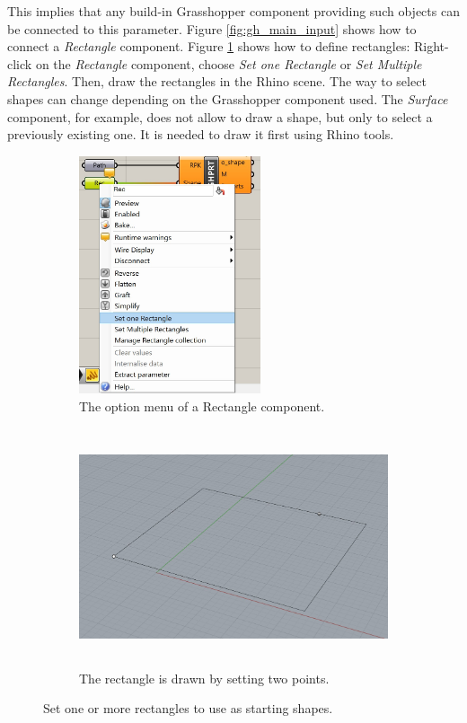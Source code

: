 This implies that any build-in Grasshopper component providing such objects can be connected to this parameter. Figure \ref{fig:gh_main_input} shows how to connect a \textit{Rectangle} component. Figure \ref{fig:gh_set_initial_shapes} shows how to define rectangles: Right-click on the \textit{Rectangle} component, choose \textit{Set one Rectangle} or \textit{Set Multiple Rectangles}. Then, draw the rectangles in the Rhino scene. The way to select shapes can change depending on the Grasshopper component used. The \textit{Surface} component, for example, does not allow to draw a shape, but only to select a previously existing one. It is needed to draw it first using Rhino tools.
\clearpage

\begin{figure}[h]
    
    \begin{subfigure}{0.5\textwidth}
        \includegraphics[width=0.9\linewidth, height=7cm]{res/man_gh_select_rectangle.jpg}
        \caption{The option menu of a Rectangle component.}
    \end{subfigure}
    \begin{subfigure}{0.5\textwidth}
        \includegraphics[width=0.9\linewidth, height=7cm]{res/man_gh_select_rectangle_2.jpg}
        \caption{The rectangle is drawn by setting two points.}
    \end{subfigure}
    
    \caption{Set one or more rectangles to use as starting shapes.}
    \label{fig:gh_set_initial_shapes}
\end{figure}

